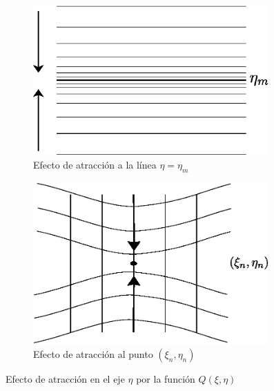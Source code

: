 \documentclass[letterpaper, openright, 12pt]{book}
\begin{document}
    \begin{figure}[htbp!]
        \centering
        \begin{subfigure}[c]{0.45\textwidth}
            \includegraphics[keepaspectratio,
                width=0.99\textwidth]{./img/densidad-eta-linea}
            \caption{Efecto de atracción a la línea $\eta = \eta_m$}
            \label{fig:densidad-eta-linea}
        \end{subfigure}
        \hfill
        \begin{subfigure}[c]{0.45\textwidth}
            \includegraphics[keepaspectratio,
                width=0.99\textwidth]{./img/densidad-eta-punto}
            \caption{Efecto de atracción al punto $(\xi_n, \eta_n)$}
            \label{fig:densidad-eta-punto}
        \end{subfigure}
        \caption[Efecto de atracción por función $Q(\xi, \eta)$]{Efecto de
            atracción en el eje $\eta$ por la función $Q(\xi, \eta)$}
    \end{figure}
\end{document}

